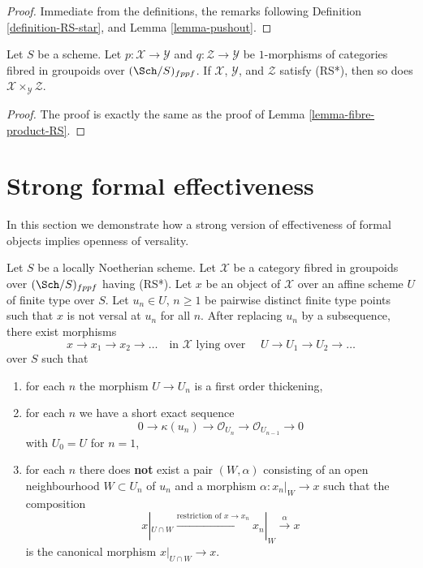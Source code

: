 \begin{proof}
Immediate from the definitions, the remarks following
Definition \ref{definition-RS-star}, and
Lemma \ref{lemma-pushout}.
\end{proof}

\begin{lemma}
\label{lemma-fibre-product-RS-star}
Let $S$ be a scheme. Let $p : \mathcal{X} \to \mathcal{Y}$ and
$q : \mathcal{Z} \to \mathcal{Y}$ be $1$-morphisms of categories
fibred in groupoids over $(\Sch/S)_{fppf}$. If $\mathcal{X}$, $\mathcal{Y}$,
and $\mathcal{Z}$ satisfy (RS*), then so
does $\mathcal{X} \times_\mathcal{Y} \mathcal{Z}$.
\end{lemma}

\begin{proof}
The proof is exactly the same as the proof of
Lemma \ref{lemma-fibre-product-RS}.
\end{proof}






\section{Strong formal effectiveness}
\label{section-strong-formal-effectiveness}

\noindent
In this section we demonstrate how a strong version of effectiveness
of formal objects implies openness of versality.

\begin{lemma}
\label{lemma-infinite-sequence}
Let $S$ be a locally Noetherian scheme. Let $\mathcal{X}$ be a category
fibred in groupoids over $(\Sch/S)_{fppf}$ having (RS*).
Let $x$ be an object of
$\mathcal{X}$ over an affine scheme $U$ of finite type over $S$.
Let $u_n \in U$, $n \geq 1$ be pairwise distinct finite type points
such that $x$ is not versal at $u_n$ for all $n$. After replacing
$u_n$ by a subsequence, there exist morphisms
$$
x \to x_1 \to x_2 \to \ldots
\quad\text{in }\mathcal{X}\text{ lying over }\quad
U \to U_1 \to U_2 \to \ldots
$$
over $S$ such that
\begin{enumerate}
\item for each $n$ the morphism $U \to U_n$ is a first order
thickening,
\item for each $n$ we have a short exact sequence
$$
0 \to \kappa(u_n) \to \mathcal{O}_{U_n} \to \mathcal{O}_{U_{n - 1}} \to 0
$$
with $U_0 = U$ for $n = 1$,
\item for each $n$ there does {\bf not} exist a pair $(W, \alpha)$
consisting of an open neighbourhood $W \subset U_n$ of $u_n$
and a morphism $\alpha : x_n|_W \to x$
such that the composition
$$
x|_{U \cap W} \xrightarrow{\text{restriction of }x \to x_n}
x_n|_W \xrightarrow{\alpha} x
$$
is the canonical morphism $x|_{U \cap W} \to x$.
\end{enumerate}
\end{lemma}


